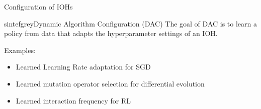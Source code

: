 \documentclass[main]{subfiles}
\begin{document}
\begin{frame}{Configuration of IOHs}
\begin{colorblock}[black]{sintefgrey}{Dynamic Algorithm Configuration (DAC)}
The goal of DAC is to learn a \alert{policy} from data that adapts the hyperparameter settings of an IOH.
\end{colorblock}
Examples:\\
\begin{itemize}
    \item Learned Learning Rate adaptation for SGD 
    \item Learned mutation operator selection for differential evolution 
    \item Learned interaction frequency for RL 
\end{itemize}
\end{frame}
\end{document}
